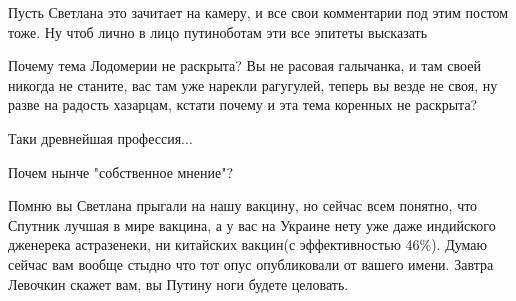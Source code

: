 \begin{itemize}
 

Пусть Светлана это зачитает на камеру, и все свои комментарии под этим постом
тоже. Ну чтоб лично в лицо путиноботам эти все эпитеты высказать


 

Почему тема Лодомерии не раскрыта? Вы не расовая галычанка, и там своей никогда
не станите, вас там уже нарекли рагугулей, теперь вы везде не своя, ну разве на
радость хазарцам, кстати почему и эта тема коренных не раскрыта?


 

Таки древнейшая профессия...


 

Почем нынче "собственное мнение"?


 

Помню вы Светлана прыгали на нашу вакцину, но сейчас всем понятно, что Спутник
лучшая в мире вакцина, а у вас на Украине нету уже даже индийского дженерека
астразенеки, ни китайских вакцин(с эффективностью 46\%). Думаю сейчас вам
вообще стыдно что тот опус опубликовали от вашего имени. Завтра Левочкин скажет
вам, вы Путину ноги будете целовать.

 


\end{itemize}
